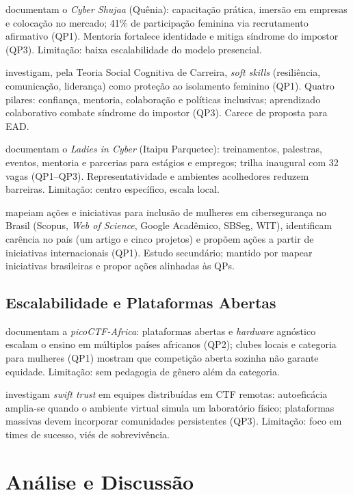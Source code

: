 \documentclass[12pt]{article}
\begin{document}
 documentam o \textit{Cyber Shujaa} (Quênia): capacitação prática, imersão em empresas e colocação no mercado; 41\% de participação feminina via recrutamento afirmativo (QP1). Mentoria fortalece identidade e mitiga síndrome do impostor (QP3). Limitação: baixa escalabilidade do modelo presencial.

 investigam, pela Teoria Social Cognitiva de Carreira, \textit{soft skills} (resiliência, comunicação, liderança) como proteção ao isolamento feminino (QP1). Quatro pilares: confiança, mentoria, colaboração e políticas inclusivas; aprendizado colaborativo combate síndrome do impostor (QP3). Carece de proposta para EAD.

 documentam o \textit{Ladies in Cyber} (Itaipu Parquetec): treinamentos, palestras, eventos, mentoria e parcerias para estágios e empregos; trilha inaugural com 32 vagas (QP1--QP3). Representatividade e ambientes acolhedores reduzem barreiras. Limitação: centro específico, escala local.

 mapeiam ações e iniciativas para inclusão de mulheres em cibersegurança no Brasil (Scopus, \textit{Web of Science}, Google Acadêmico, SBSeg, WIT), identificam carência no país (um artigo e cinco projetos) e propõem ações a partir de iniciativas internacionais (QP1). Estudo secundário; mantido por mapear iniciativas brasileiras e propor ações alinhadas às QPs.

\subsection{Escalabilidade e Plataformas Abertas}

 documentam a \textit{picoCTF-Africa}: plataformas abertas e \textit{hardware} agnóstico escalam o ensino em múltiplos países africanos (QP2); clubes locais e categoria para mulheres (QP1) mostram que competição aberta sozinha não garante equidade. Limitação: sem pedagogia de gênero além da categoria.

 investigam \textit{swift trust} em equipes distribuídas em CTF remotas: autoeficácia amplia-se quando o ambiente virtual simula um laboratório físico; plataformas massivas devem incorporar comunidades persistentes (QP3). Limitação: foco em times de sucesso, viés de sobrevivência.


\section{Análise e Discussão} \label{sec:analise}
\end{document}
